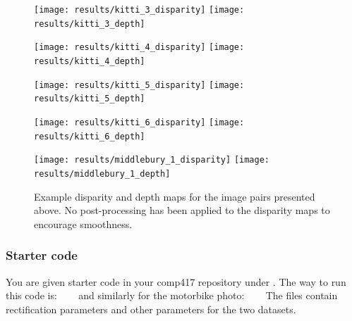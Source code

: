 \documentclass[a4paper,10pt]{article}
\begin{document}
\begin{figure}[h!]
  \begin{center}
    \texttt{[image: results/kitti\_3\_disparity]}
    \texttt{[image: results/kitti\_3\_depth]}
   \end{center}
\end{figure}

\begin{figure}[h!]
  \begin{center}
    \texttt{[image: results/kitti\_4\_disparity]}
    \texttt{[image: results/kitti\_4\_depth]}
   \end{center}
\end{figure}

\begin{figure}[h!]
  \begin{center}
    \texttt{[image: results/kitti\_5\_disparity]}
    \texttt{[image: results/kitti\_5\_depth]}
   \end{center}
\end{figure}

\begin{figure}[h!]
  \begin{center}
    \texttt{[image: results/kitti\_6\_disparity]}
    \texttt{[image: results/kitti\_6\_depth]}
   \end{center}
\end{figure}

\begin{figure}[h!]
  \begin{center}
    \texttt{[image: results/middlebury\_1\_disparity]}
    \texttt{[image: results/middlebury\_1\_depth]}
  \end{center} 
  \caption{Example disparity and depth maps for the image pairs presented above. No post-processing has been applied to the disparity maps to encourage smoothness.}
  \label{fig:results}
\end{figure}
\subsubsection{Starter code}
\noindent You are given starter code in your comp417 repository under . The way to run this code is:
\newline
\newline
{} $\;$  $\;$  $\;$ 
\newline
\newline
\noindent and similarly for the motorbike photo:
 $\;$  $\;$  $\;$ 
\newline
\newline
\noindent The  files contain rectification parameters and other parameters for the two datasets.
\end{document}
